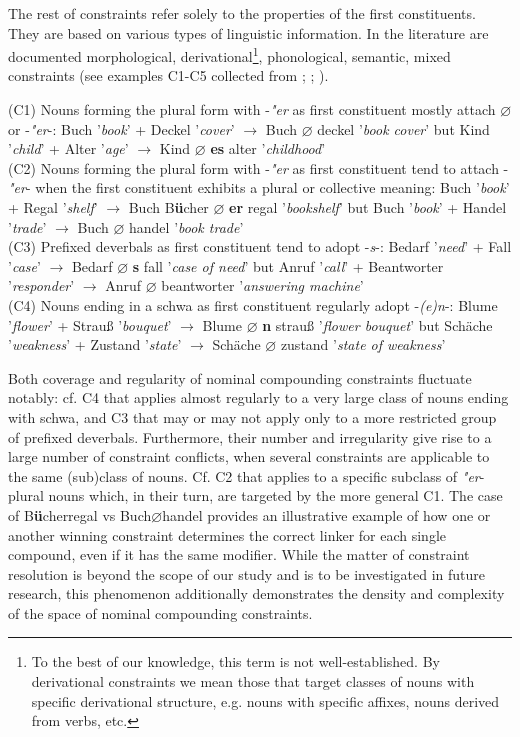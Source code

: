 \documentclass[10pt, a4paper]{article}
\newcommand{\zeroLinker}{\ensuremath{\boldsymbol{\varnothing}}}
\newcommand{\compEx}[7]{%
    #1 '\textit{#2}' + #4 '\textit{#5}'
    $\rightarrow$
    \if\relax\detokenize{#6}\relax
      #1%
    \else
      #6%
    \fi
    \if\relax\detokenize{#3}\relax
      \zeroLinker%
    \else
      \textbf{#3}%
    \fi
    \MakeLowercase{#4} '\textit{#7}'%
}
\begin{document}
The rest of constraints refer solely to the properties of the first constituents. They are based on various types of linguistic information. In the literature are documented morphological, derivational\footnote{To the best of our knowledge, this term is not well-established. By derivational constraints we mean those that target classes of nouns with specific derivational structure, e.g. nouns with specific affixes, nouns derived from verbs, etc.}, phonological, semantic, mixed constraints (see examples C1-C5 collected from \citealp[228-230]{eisenberg_2013}; \citealp{libben_etal_2009}; \citealp{nuebling_szczepaniak_2013}).

\begin{tcolorbox}[breakable]

    (C1) Nouns forming the plural form with -\textit{"er} as first constituent mostly attach \zeroLinker or -\textit{"er}-: \compEx{Buch}{book}{}{Deckel}{cover}{}{book cover} but \compEx{Kind}{child}{es}{Alter}{age}{}{childhood}\\

    (C2) Nouns forming the plural form with -\textit{"er} as first constituent tend to attach -\textit{"er}- when the first constituent exhibits a plural or collective meaning: \compEx{Buch}{book}{er}{Regal}{shelf}{B\textbf{ü}cher}{bookshelf} but \compEx{Buch}{book}{}{Handel}{trade}{}{book trade}\\

    (C3) Prefixed deverbals as first constituent tend to adopt -\textit{s}-: \compEx{Bedarf}{need}{s}{Fall}{case}{}{case of need} but \compEx{Anruf}{call}{}{Beantworter}{responder}{}{answering machine}\\
    
    (C4) Nouns ending in a schwa as first constituent regularly adopt -\textit{(e)n}-: \compEx{Blume}{flower}{n}{Strauß}{bouquet}{}{flower bouquet} but \compEx{Schäche}{weakness}{}{Zustand}{state}{}{state of weakness}\\
        
\end{tcolorbox}

Both coverage and regularity of nominal compounding constraints fluctuate notably: cf. C4 that applies almost regularly to a very large class of nouns ending with schwa, and C3 that may or may not apply only to a more restricted group of prefixed deverbals. Furthermore, their number and irregularity give rise to a large number of constraint conflicts, when several constraints are applicable to the same (sub)class of nouns. Cf. C2 that applies to a specific subclass of \textit{"er}-plural nouns which, in their turn, are targeted by the more general C1. The case of B\textbf{ü}cherregal vs Buch{\zeroLinker}handel provides an illustrative example of how one or another winning constraint determines the correct linker for each single compound, even if it has the same modifier. While the matter of constraint resolution is beyond the scope of our study and is to be investigated in future research, this phenomenon additionally demonstrates the density and complexity of the space of nominal compounding constraints.
\end{document}
